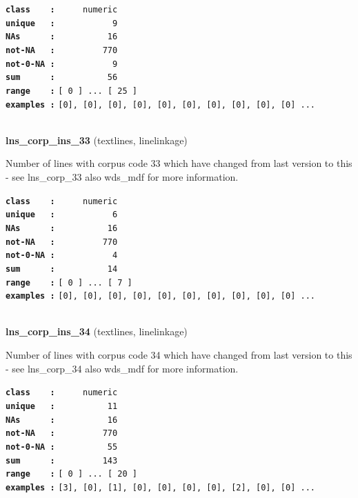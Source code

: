 \documentclass[]{article}
\begin{document}
\textbf{\texttt{class\ \ \ \ :}} \texttt{~~~~~numeric}\\
\textbf{\texttt{unique\ \ \ :}} \texttt{~~~~~~~~~~~9}\\
\textbf{\texttt{NAs\ \ \ \ \ \ :}} \texttt{~~~~~~~~~~16}\\
\textbf{\texttt{not-NA\ \ \ :}} \texttt{~~~~~~~~~770}\\
\textbf{\texttt{not-0-NA\ :}} \texttt{~~~~~~~~~~~9}\\
\textbf{\texttt{sum\ \ \ \ \ \ :}} \texttt{~~~~~~~~~~56}\\
\textbf{\texttt{range\ \ \ \ :}}
\texttt{{[}\ 0\ {]}\ ...\ {[}\ 25\ {]}}\\
\textbf{\texttt{examples\ :}}
\texttt{{[}0{]},\ {[}0{]},\ {[}0{]},\ {[}0{]},\ {[}0{]},\ {[}0{]},\ {[}0{]},\ {[}0{]},\ {[}0{]},\ {[}0{]}\ ...}\\

~

\textbf{lns\_corp\_ins\_33} (textlines, linelinkage)

Number of lines with corpus code 33 which have changed from last version
to this - see lns\_corp\_33 also wds\_mdf for more information.

\textbf{\texttt{class\ \ \ \ :}} \texttt{~~~~~numeric}\\
\textbf{\texttt{unique\ \ \ :}} \texttt{~~~~~~~~~~~6}\\
\textbf{\texttt{NAs\ \ \ \ \ \ :}} \texttt{~~~~~~~~~~16}\\
\textbf{\texttt{not-NA\ \ \ :}} \texttt{~~~~~~~~~770}\\
\textbf{\texttt{not-0-NA\ :}} \texttt{~~~~~~~~~~~4}\\
\textbf{\texttt{sum\ \ \ \ \ \ :}} \texttt{~~~~~~~~~~14}\\
\textbf{\texttt{range\ \ \ \ :}}
\texttt{{[}\ 0\ {]}\ ...\ {[}\ 7\ {]}}\\
\textbf{\texttt{examples\ :}}
\texttt{{[}0{]},\ {[}0{]},\ {[}0{]},\ {[}0{]},\ {[}0{]},\ {[}0{]},\ {[}0{]},\ {[}0{]},\ {[}0{]},\ {[}0{]}\ ...}\\

~

\textbf{lns\_corp\_ins\_34} (textlines, linelinkage)

Number of lines with corpus code 34 which have changed from last version
to this - see lns\_corp\_34 also wds\_mdf for more information.

\textbf{\texttt{class\ \ \ \ :}} \texttt{~~~~~numeric}\\
\textbf{\texttt{unique\ \ \ :}} \texttt{~~~~~~~~~~11}\\
\textbf{\texttt{NAs\ \ \ \ \ \ :}} \texttt{~~~~~~~~~~16}\\
\textbf{\texttt{not-NA\ \ \ :}} \texttt{~~~~~~~~~770}\\
\textbf{\texttt{not-0-NA\ :}} \texttt{~~~~~~~~~~55}\\
\textbf{\texttt{sum\ \ \ \ \ \ :}} \texttt{~~~~~~~~~143}\\
\textbf{\texttt{range\ \ \ \ :}}
\texttt{{[}\ 0\ {]}\ ...\ {[}\ 20\ {]}}\\
\textbf{\texttt{examples\ :}}
\texttt{{[}3{]},\ {[}0{]},\ {[}1{]},\ {[}0{]},\ {[}0{]},\ {[}0{]},\ {[}0{]},\ {[}2{]},\ {[}0{]},\ {[}0{]}\ ...}\\
\end{document}
